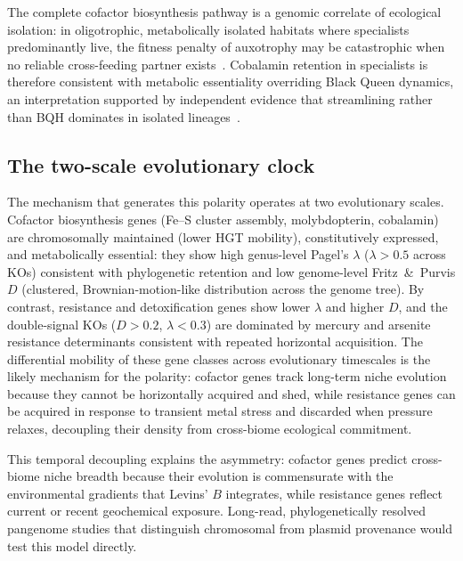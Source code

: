 \documentclass[times]{zHenriquesLab-StyleBioRxiv}
\begin{document}
The complete cofactor biosynthesis pathway is a genomic correlate of ecological
isolation: in oligotrophic, metabolically isolated habitats where specialists
predominantly live, the fitness penalty of auxotrophy may be catastrophic when
no reliable cross-feeding partner exists~\cite{sanudo2014,henderson2026}.
Cobalamin retention in specialists is therefore consistent with metabolic
essentiality overriding Black Queen dynamics, an interpretation supported by
independent evidence that streamlining rather than BQH dominates in isolated
lineages~\cite{hao2026,henderson2026}.



\subsection{The two-scale evolutionary clock}

The mechanism that generates this polarity operates at two evolutionary scales.
Cofactor biosynthesis genes (Fe--S cluster assembly, molybdopterin, cobalamin)
are chromosomally maintained (lower HGT mobility), constitutively expressed, and metabolically essential:
they show high genus-level Pagel's $\lambda$ ($\lambda > 0.5$ across KOs)
consistent with phylogenetic retention and low genome-level Fritz~\&~Purvis $D$
(clustered, Brownian-motion-like distribution across the genome tree). By
contrast, resistance and detoxification genes show lower $\lambda$ and higher
$D$, and the double-signal KOs ($D > 0.2$, $\lambda < 0.3$) are dominated by
mercury and arsenite resistance determinants consistent with repeated horizontal
acquisition. The differential mobility of these gene classes across evolutionary
timescales is the likely mechanism for the polarity: cofactor genes track
long-term niche evolution because they cannot be horizontally acquired and shed,
while resistance genes can be acquired in response to transient metal stress and
discarded when pressure relaxes, decoupling their density from cross-biome
ecological commitment.

This temporal decoupling explains the asymmetry: cofactor genes predict
cross-biome niche breadth because their evolution is commensurate with the
environmental gradients that Levins' $B$ integrates, while resistance genes
reflect current or recent geochemical exposure. Long-read, phylogenetically
resolved pangenome studies that distinguish chromosomal from plasmid provenance
would test this model directly.
\end{document}
